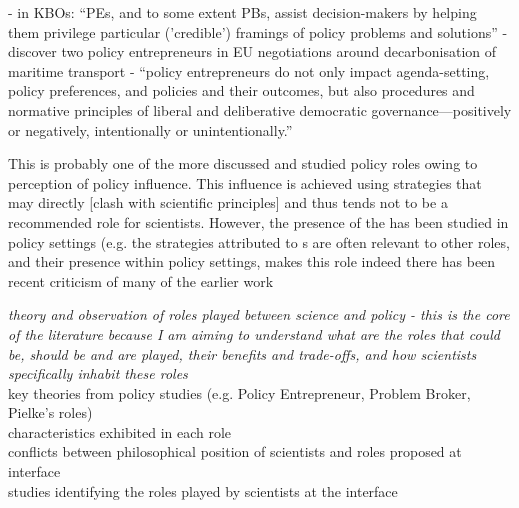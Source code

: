 \cite{MacKillopCDD2023} - in KBOs: ``PEs, and to some extent PBs, assist decision-makers by helping them privilege particular ('credible') framings of policy problems and solutions''
\cite{vonMalmborg2024transport} - discover two policy entrepreneurs in EU negotiations around decarbonisation of maritime transport
\cite{vonMalmborg2024strategies} - ``policy entrepreneurs do not only impact agenda-setting, policy preferences, and policies and their outcomes, but also procedures and normative principles of liberal and deliberative democratic governance---positively or negatively, intentionally or unintentionally.''

This is probably one of the more discussed and studied policy roles owing to perception of policy influence. This influence is achieved using strategies that may directly [clash with scientific principles] and thus tends not to be a recommended role for scientists. However, the presence of the \PE has been studied in \CAN policy settings (e.g. \cite{MintromL2017,CarterC2018}  the strategies attributed to \PE s are often relevant to other \SPI roles, and their presence within policy settings, makes this role   indeed there has been recent criticism of many of the earlier work

\emph{theory and observation of roles played between science and policy - this is the core of the literature because I am aiming to understand what are the roles that could be, should be and are played, their benefits and trade-offs, and how scientists specifically inhabit these roles}\\
key theories from policy studies (e.g. Policy Entrepreneur, Problem Broker, Pielke's roles)\\
characteristics exhibited in each role\\
conflicts between philosophical position of scientists and roles proposed at interface\\
studies identifying the roles played by scientists at the interface

